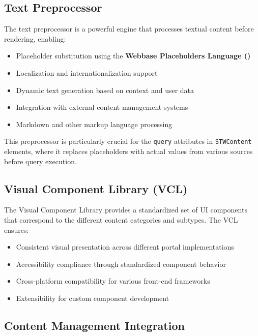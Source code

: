 \subsection{Text Preprocessor}
\label{sec:text-preprocessor}

The \wbdl{} text preprocessor is a powerful engine that processes textual content before rendering, enabling:

\begin{itemize}
\item Placeholder substitution using the \textbf{Webbase Placeholders Language (\wbpl{})}
\item Localization and internationalization support
\item Dynamic text generation based on context and user data
\item Integration with external content management systems
\item Markdown and other markup language processing
\end{itemize}

This preprocessor is particularly crucial for the \texttt{query} attributes in \texttt{STWContent} elements, where it replaces placeholders with actual values from various sources before query execution.

\subsection{Visual Component Library (VCL)}
\label{sec:vcl}

The Visual Component Library provides a standardized set of UI components that correspond to the different content categories and subtypes. The VCL ensures:

\begin{itemize}
\item Consistent visual presentation across different portal implementations
\item Accessibility compliance through standardized component behavior
\item Cross-platform compatibility for various front-end frameworks
\item Extensibility for custom component development
\end{itemize}

\subsection{Content Management Integration}
\label{sec:cms-integration}

